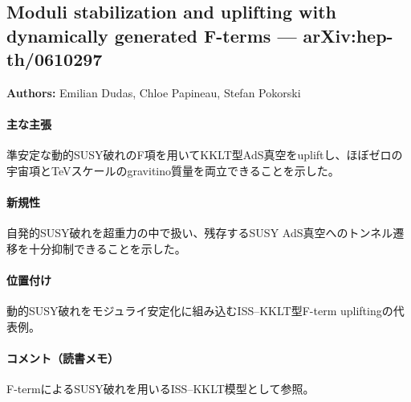 \subsection{Moduli stabilization and uplifting with dynamically generated F-terms --- arXiv:hep-th/0610297}

\textbf{Authors:} Emilian Dudas, Chloe Papineau, Stefan Pokorski

\paragraph{主な主張}
準安定な動的SUSY破れのF項を用いてKKLT型AdS真空をupliftし、ほぼゼロの宇宙項とTeVスケールのgravitino質量を両立できることを示した\cite{Dudas:2006gr}。

\paragraph{新規性}
自発的SUSY破れを超重力の中で扱い、残存するSUSY AdS真空へのトンネル遷移を十分抑制できることを示した。

\paragraph{位置付け}
動的SUSY破れをモジュライ安定化に組み込むISS--KKLT型F-term upliftingの代表例。

\paragraph{コメント（読書メモ）}
F-termによるSUSY破れを用いるISS--KKLT模型として参照。
